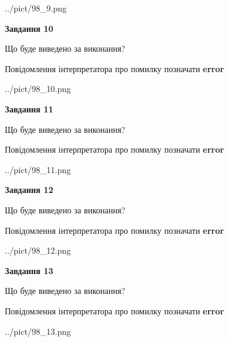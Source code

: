 \documentclass[11pt, ukrainian]{article}
\begin{document}
{\begin {large}
\begin{center}
	{../pict/98_9.png}
\end{center}
\newpage

{\begin {center}\textbf{Завдання 10}\end {center}}\par
Що буде виведено за виконання? \par
Повідомлення інтерпретатора про помилку позначати \textbf{error}

\begin{center}
	{../pict/98_10.png}
\end{center}
\newpage

{\begin {center}\textbf{Завдання 11}\end {center}}\par
Що буде виведено за виконання? \par
Повідомлення інтерпретатора про помилку позначати \textbf{error}

\begin{center}
	{../pict/98_11.png}
\end{center}
\newpage

{\begin {center}\textbf{Завдання 12}\end {center}}\par
Що буде виведено за виконання? \par
Повідомлення інтерпретатора про помилку позначати \textbf{error}

\begin{center}
	{../pict/98_12.png}
\end{center}
\newpage

{\begin {center}\textbf{Завдання 13}\end {center}}\par
Що буде виведено за виконання? \par
Повідомлення інтерпретатора про помилку позначати \textbf{error}

\begin{center}
	{../pict/98_13.png}
\end{center}
\newpage


\end{large}}
\end{document}
